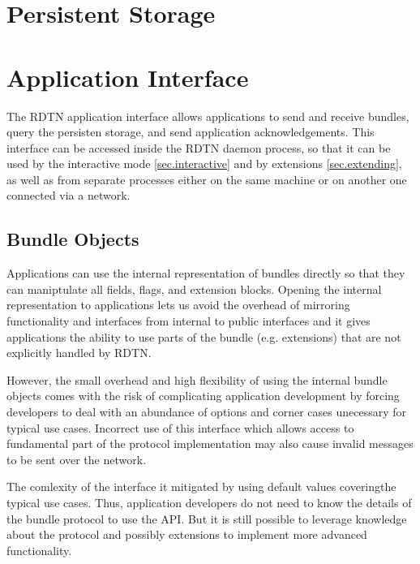 \documentclass{article}
\begin{document}
\section{Persistent Storage}\label{sec.storage}

\section{Application Interface}\label{sec.appif}

The RDTN application interface allows applications to send and receive bundles,
query the persisten storage, and send application acknowledgements. This
interface can be accessed inside the RDTN daemon process, so that it can be used
by the interactive mode \ref{sec.interactive} and by extensions
\ref{sec.extending}, as well as from separate processes either on the same
machine or on another one connected via a network.

\subsection{Bundle Objects}\label{sec.bundle-obj}

Applications can use the internal representation of bundles directly so that
they can maniptulate all fields, flags, and extension blocks. Opening the
internal representation to applications lets us avoid the overhead of mirroring
functionality and interfaces from internal to public interfaces and it gives
applications the ability to use parts of the bundle (e.g. extensions) that are
not explicitly handled by RDTN.

However, the small overhead and high flexibility of using the internal bundle
objects comes with the risk of complicating application development by forcing
developers to deal with an abundance of options and corner cases unecessary for
typical use cases. Incorrect use of this interface which allows access to
fundamental part of the protocol implementation may also cause invalid messages
to be sent over the network.

The comlexity of the interface it mitigated by using default values coveringthe
typical use cases. Thus, application developers do not need to know the details
of the bundle protocol to use the API. But it is still possible to leverage
knowledge about the protocol and possibly extensions to implement more advanced
functionality.
\end{document}
